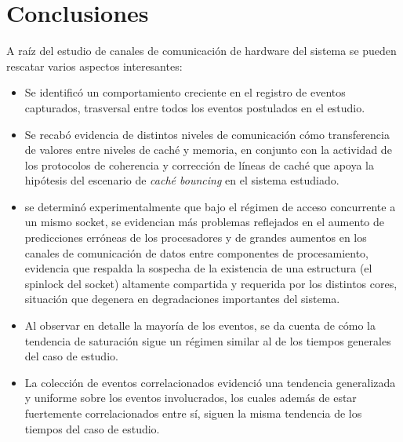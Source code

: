 \section{Conclusiones}
A raíz del estudio de canales de comunicación de hardware del sistema se pueden rescatar varios aspectos interesantes:
\begin{itemize}
\item Se identificó un comportamiento creciente en el registro de eventos capturados, trasversal entre todos los eventos postulados en el estudio.
\item Se recabó evidencia de distintos niveles de comunicación cómo transferencia de valores entre niveles de caché y memoria, en conjunto con la actividad de los protocolos de coherencia y corrección de líneas de caché que apoya la hipótesis del escenario de \emph{caché bouncing} en el sistema estudiado.
\item se determinó experimentalmente que bajo el régimen de acceso concurrente a un mismo socket, se evidencian más problemas reflejados en el aumento de predicciones erróneas de los procesadores y de grandes aumentos en los canales de comunicación de datos entre componentes de procesamiento, evidencia que respalda la sospecha de la existencia de una estructura (el spinlock del socket) altamente compartida y requerida por los distintos cores, situación que degenera en degradaciones importantes del sistema.
\item Al observar en detalle la mayoría de los eventos, se da cuenta de cómo la tendencia de saturación sigue un régimen similar al de los tiempos generales del caso de estudio.
\item La colección de eventos correlacionados evidenció una tendencia generalizada y uniforme sobre los eventos involucrados, los cuales además de estar fuertemente correlacionados entre sí, siguen la misma tendencia de los tiempos del caso de estudio.
\end{itemize}